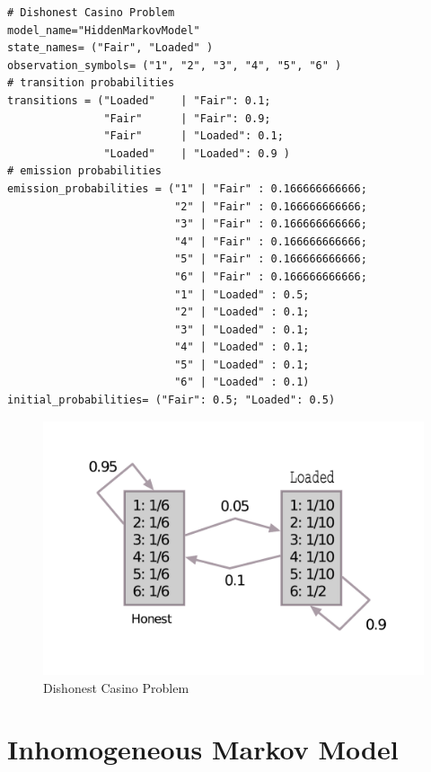 \begin{Verbatim}[frame=single,label="hmm.txt"]
# Dishonest Casino Problem
model_name="HiddenMarkovModel"
state_names= ("Fair", "Loaded" )
observation_symbols= ("1", "2", "3", "4", "5", "6" )
# transition probabilities
transitions = ("Loaded"    | "Fair": 0.1;
               "Fair"      | "Fair": 0.9;
               "Fair"      | "Loaded": 0.1;
               "Loaded"    | "Loaded": 0.9 )
# emission probabilities
emission_probabilities = ("1" | "Fair" : 0.166666666666; 
                          "2" | "Fair" : 0.166666666666;  
                          "3" | "Fair" : 0.166666666666; 
                          "4" | "Fair" : 0.166666666666; 
                          "5" | "Fair" : 0.166666666666; 
                          "6" | "Fair" : 0.166666666666; 
                          "1" | "Loaded" : 0.5;            
                          "2" | "Loaded" : 0.1;            
                          "3" | "Loaded" : 0.1;            
                          "4" | "Loaded" : 0.1;            
                          "5" | "Loaded" : 0.1;            
                          "6" | "Loaded" : 0.1)            
initial_probabilities= ("Fair": 0.5; "Loaded": 0.5)

\end{Verbatim}

\begin{figure}[!h]
  \centering
  \includegraphics[scale=0.5]{fig_cassino} 
  \caption{Dishonest Casino Problem}
  \label{fig:hmm-casino}
\end{figure}

\section{Inhomogeneous Markov Model}

